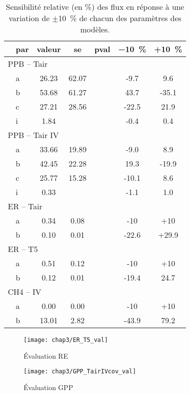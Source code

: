 \begin{table}
\centering
\caption{Sensibilité relative (en \%) des flux en réponse à une variation de $\pm$\SI{10}{\percent} de chacun des paramètres des modèles.}
\label{table:mdl_par}
\begin{tabular}{llccccc}\toprule

& par & valeur & se & pval & \SI{-10}{\percent} & +\SI{+10}{\percent} \\ \midrule
\multicolumn{7}{l}{PPB -- Tair}  \\ [+.5ex]
& a & 26.23 & 62.07 & & -9.7 & 9.6 	\\
& b & 53.68 & 61.27 & & 43.7 &-35.1 \\
& c & 27.21 & 28.56 & &-22.5 & 21.9 \\
& i &  1.84 &       & & -0.4 &  0.4 \\[+1ex]
\multicolumn{7}{l}{PPB -- Tair IV}  \\ [+.5ex]
& a & 33.66 & 19.89 & & -9.0 & 8.9 \\
& b & 42.45 & 22.28 & & 19.3 & -19.9 \\
& c & 25.77 & 15.28 & & -10.1 & 8.6 \\
& i &  0.33 &       & & -1.1 & 1.0 \\[+1ex]
\multicolumn{7}{l}{ER -- Tair}  \\ [+.5ex]
& a & 0.34 & 0.08 &  & -10 & +10 \\
& b & 0.10 & 0.01  & & -22.6 & +29.9  \\[+1ex]
\multicolumn{7}{l}{ER -- T5}  \\ [+.5ex]
& a & 0.51 & 0.12 & & -10 & +10 \\
& b & 0.12 & 0.01 & & -19.4 & 24.7 \\[+1ex]
\multicolumn{7}{l}{CH4 -- IV}  \\ [+.5ex]
& a & 0.00 & 0.00 & & -10 & +10 \\
& b & 13.01 & 2.82 & & -43.9 & 79.2 \\[+1ex]
\bottomrule
\end{tabular}
\end{table}


\begin{figure}
\centering
\texttt{[image: chap3/ER\_T5\_val]}
\caption{Évaluation RE}
\label{fig:RE_T5_val}
\end{figure}
\begin{figure}
\centering
\texttt{[image: chap3/GPP\_TairIVcov\_val]}
\caption{Évaluation GPP}
\label{fig:GPP_TairIVcov_val}
\end{figure}

